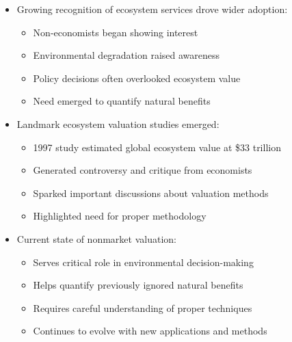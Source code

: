 \documentclass[
  ignorenonframetext,
]{beamer}
\providecommand{\tightlist}{%
  \setlength{\itemsep}{0pt}\setlength{\parskip}{0pt}}\usepackage{longtable,booktabs,array}
\begin{document}
\begin{frame}
\begin{itemize}
\tightlist
\item
  Growing recognition of ecosystem services drove wider adoption:

  \begin{itemize}
  \tightlist
  \item
    Non-economists began showing interest
  \item
    Environmental degradation raised awareness
  \item
    Policy decisions often overlooked ecosystem value
  \item
    Need emerged to quantify natural benefits
  \end{itemize}
\item
  Landmark ecosystem valuation studies emerged:

  \begin{itemize}
  \tightlist
  \item
    1997 study estimated global ecosystem value at \$33 trillion
  \item
    Generated controversy and critique from economists
  \item
    Sparked important discussions about valuation methods
  \item
    Highlighted need for proper methodology
  \end{itemize}
\item
  Current state of nonmarket valuation:

  \begin{itemize}
  \tightlist
  \item
    Serves critical role in environmental decision-making
  \item
    Helps quantify previously ignored natural benefits
  \item
    Requires careful understanding of proper techniques
  \item
    Continues to evolve with new applications and methods
  \end{itemize}
\end{itemize}
\end{frame}
\end{document}
